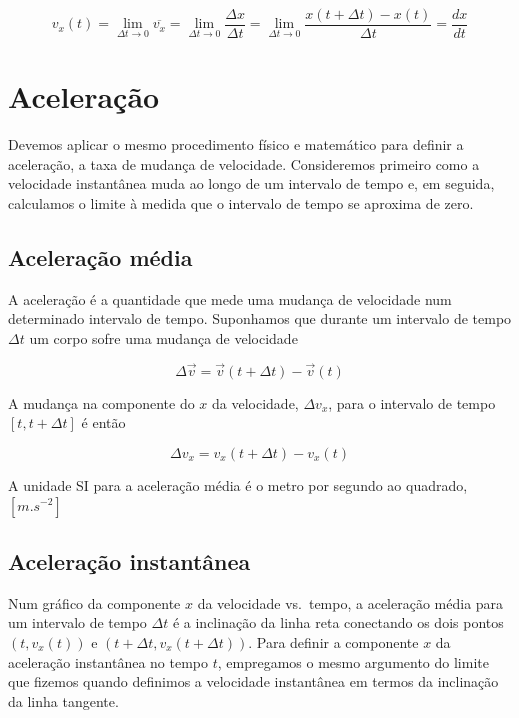 \documentclass[
  portuguese,
  ]{book}
\begin{document}
\[v_x(t)=\lim_{\Delta t \rightarrow0}{\overline{v_x}}=\lim_{\Delta t \rightarrow0}\frac{\Delta x}{\Delta t}= \lim_{\Delta t \rightarrow0} \frac{x(t+\Delta t)-x(t)}{\Delta t}=\frac{dx}{dt}\]

\hypertarget{acelerauxe7uxe3o}{%
\section{Aceleração}\label{acelerauxe7uxe3o}}

Devemos aplicar o mesmo procedimento físico e matemático para definir a aceleração, a taxa de mudança de velocidade. Consideremos primeiro como a velocidade instantânea muda ao longo de um intervalo de tempo e, em seguida, calculamos o limite à medida que o intervalo de tempo se aproxima de zero.

\hypertarget{acelerauxe7uxe3o-muxe9dia}{%
\subsection{Aceleração média}\label{acelerauxe7uxe3o-muxe9dia}}

A aceleração é a quantidade que mede uma mudança de velocidade num determinado intervalo de tempo. Suponhamos que durante um intervalo de tempo \(\Delta t\) um corpo sofre uma mudança de velocidade

\[\Delta \overrightarrow{v}=\overrightarrow{v}(t+\Delta t)-\overrightarrow{v}(t)\]

A mudança na componente do \(x\) da velocidade, \(\Delta v_x\), para o intervalo de tempo \([t,t+\Delta t]\) é então

\[\Delta v_x=v_x(t+\Delta t)-v_x(t)\]

A unidade SI para a aceleração média é o metro por segundo ao quadrado, \([m.s^{-2}]\)

\hypertarget{acelerauxe7uxe3o-instantuxe2nea}{%
\subsection{Aceleração instantânea}\label{acelerauxe7uxe3o-instantuxe2nea}}

Num gráfico da componente \(x\) da velocidade vs.~tempo, a aceleração média para um intervalo de tempo \(\Delta t\) é a inclinação da linha reta conectando os dois pontos \((t, v_x (t))\) e \((t +\Delta t, v_x (t +\Delta t))\). Para definir a componente \(x\) da aceleração instantânea no tempo \(t\), empregamos o mesmo argumento do limite que fizemos quando definimos a velocidade instantânea em termos da inclinação da linha tangente.
\end{document}
